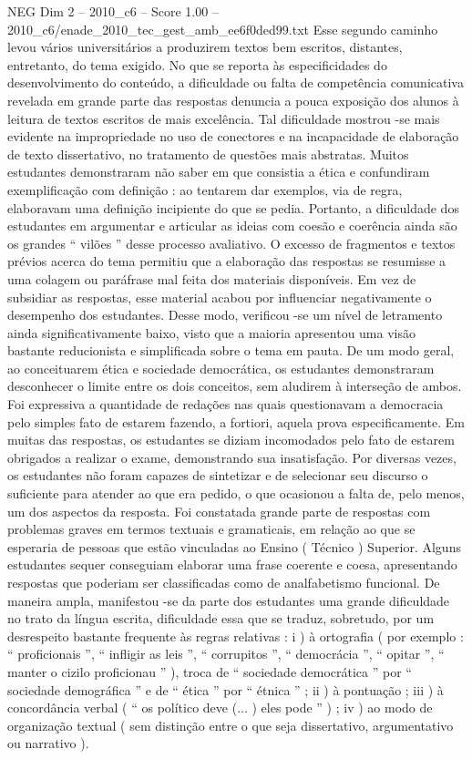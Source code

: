 \begin{textsample}{NEG Dim 2 – 2010\_c6 – Score 1.00 – 2010\_c6/enade\_2010\_tec\_gest\_amb\_ee6f0ded99.txt}
Esse segundo caminho levou vários universitários a produzirem textos bem escritos, distantes, entretanto, do tema exigido.
No que se reporta às especificidades do desenvolvimento do conteúdo, a dificuldade ou falta de competência comunicativa revelada em grande parte das respostas denuncia a pouca exposição dos alunos à leitura de textos escritos de mais excelência.
Tal dificuldade mostrou -se mais evidente na impropriedade no uso de conectores e na incapacidade de elaboração de texto dissertativo, no tratamento de questões mais abstratas.
Muitos estudantes demonstraram não saber em que consistia a ética e confundiram exemplificação com definição : ao tentarem dar exemplos, via de regra, elaboravam uma definição incipiente do que se pedia.
Portanto, a dificuldade dos estudantes em argumentar e articular as ideias com coesão e coerência ainda são os grandes “ vilões ” desse processo avaliativo.
O excesso de fragmentos e textos prévios acerca do tema permitiu que a elaboração das respostas se resumisse a uma colagem ou paráfrase mal feita dos materiais disponíveis.
Em vez de subsidiar as respostas, esse material acabou por influenciar negativamente o desempenho dos estudantes.
Desse modo, verificou -se um nível de letramento ainda significativamente baixo, visto que a maioria apresentou uma visão bastante reducionista e simplificada sobre o tema em pauta.
De um modo geral, ao conceituarem ética e sociedade democrática, os estudantes demonstraram desconhecer o limite entre os dois conceitos, sem aludirem à interseção de ambos.
Foi expressiva a quantidade de redações nas quais questionavam a democracia pelo simples fato de estarem fazendo, a fortiori, aquela prova especificamente.
Em muitas das respostas, os estudantes se diziam incomodados pelo fato de estarem obrigados a realizar o exame, demonstrando sua insatisfação.
Por diversas vezes, os estudantes não foram capazes de sintetizar e de selecionar seu discurso o suficiente para atender ao que era pedido, o que ocasionou a falta de, pelo menos, um dos aspectos da resposta.
Foi constatada grande parte de respostas com problemas graves em termos textuais e gramaticais, em relação ao que se esperaria de pessoas que estão vinculadas ao Ensino ( Técnico ) Superior.
Alguns estudantes sequer conseguiam elaborar uma frase coerente e coesa, apresentando respostas que poderiam ser classificadas como de analfabetismo funcional.
De maneira ampla, manifestou -se da parte dos estudantes uma grande dificuldade no trato da língua escrita, dificuldade essa que se traduz, sobretudo, por um desrespeito bastante frequente às regras relativas : i ) à ortografia ( por exemplo : “ proficionais ”, “ infligir as leis ”, “ corrupitos ”, “ democrácia ”, “ opitar ”, “ manter o cizilo proficionau ” ), troca de “ sociedade democrática ” por “ sociedade demográfica ” e de “ ética ” por “ étnica ” ; ii ) à pontuação ; iii ) à concordância verbal ( “ os político deve (... ) eles pode ” ) ; iv ) ao modo de organização textual ( sem distinção entre o que seja dissertativo, argumentativo ou narrativo ).

\end{textsample}
